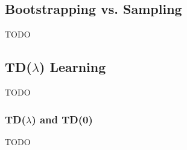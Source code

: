 \subsection{Bootstrapping vs. Sampling}\label{subsec:bootstrapping-vs-sampling}
TODO
%

\subsection{TD($\lambda$) Learning}\label{subsec:td-lambda-learning}
TODO
%
%
%
%

\subsubsection{TD($\lambda$) and TD(0)}
TODO
%


